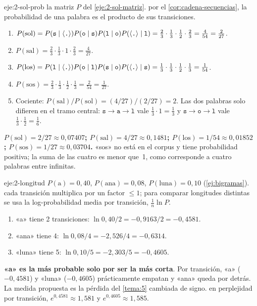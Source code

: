 \begin{solucion}{eje:2-sol-prob}
\datos la matriz $P$ del \cref{eje:2-sol-matriz}.
\planteamiento por el \cref{cor:cadena-secuencias}, la probabilidad de una palabra es el producto de sus transiciones.
\pasos
\begin{enumerate}[label=\arabic*.]
  \item $P(\text{sol})=P(\texttt{s}\mid\langle\texttt{.}\rangle)P(\texttt{o}\mid\texttt{s})P(\texttt{l}\mid\texttt{o})P(\langle\texttt{.}\rangle\mid\texttt{l})=\frac23\cdot\frac13\cdot\frac12\cdot\frac23=\frac{4}{54}=\frac{2}{27}$.
  \item $P(\text{sal})=\frac23\cdot\frac13\cdot 1\cdot\frac23=\frac{4}{27}$.
  \item $P(\text{los})=P(\texttt{l}\mid\langle\texttt{.}\rangle)P(\texttt{o}\mid\texttt{l})P(\texttt{s}\mid\texttt{o})P(\langle\texttt{.}\rangle\mid\texttt{s})=\frac13\cdot\frac13\cdot\frac12\cdot\frac13=\frac{1}{54}$.
  \item $P(\text{sos})=\frac23\cdot\frac13\cdot\frac12\cdot\frac13=\frac{2}{54}=\frac{1}{27}$.
  \item Cociente: $P(\text{sal})/P(\text{sol})=(4/27)/(2/27)=2$. Las dos palabras solo difieren en el tramo central: $\texttt{s}\to\texttt{a}\to\texttt{l}$ vale $\frac13\cdot 1=\frac13$ y $\texttt{s}\to\texttt{o}\to\texttt{l}$ vale $\frac13\cdot\frac12=\frac16$.
\end{enumerate}
\resultado \textbf{$P(\text{sol})=2/27\approx 0{,}07407$; $P(\text{sal})=4/27\approx 0{,}1481$; $P(\text{los})=1/54\approx 0{,}01852$; $P(\text{sos})=1/27\approx 0{,}03704$.}
\comprobacion «sos» no está en el corpus y tiene probabilidad positiva; la suma de las cuatro es menor que~1, como corresponde a cuatro palabras entre infinitas.
\end{solucion}

\begin{solucion}{eje:2-longitud}
\datos $P(\text{a})=0{,}40$, $P(\text{ana})=0{,}08$, $P(\text{luna})=0{,}10$ (\cref{ej:bigramas}).
\planteamiento cada transición multiplica por un factor $\le 1$; para comparar longitudes distintas se usa la log-probabilidad media por transición, $\frac1n\ln P$.
\pasos
\begin{enumerate}[label=\arabic*.]
  \item «a» tiene 2 transiciones: $\ln 0{,}40/2=-0{,}9163/2=-0{,}4581$.
  \item «ana» tiene 4: $\ln 0{,}08/4=-2{,}526/4=-0{,}6314$.
  \item «luna» tiene 5: $\ln 0{,}10/5=-2{,}303/5=-0{,}4605$.
\end{enumerate}
\resultado \textbf{«a» es la más probable solo por ser la más corta}. Por transición, «a» ($-0{,}4581$) y «luna» ($-0{,}4605$) prácticamente empatan y «ana» queda por detrás. La medida propuesta es la pérdida del \cref{tema:5} cambiada de signo.
\comprobacion en perplejidad por transición, $e^{0{,}4581}\approx 1{,}581$ y $e^{0{,}4605}\approx 1{,}585$.
\end{solucion}

